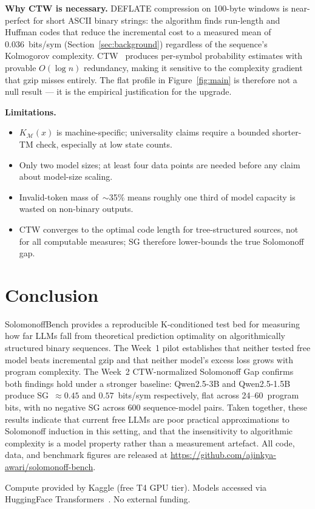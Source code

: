 \documentclass{article}
\begin{document}
\textbf{Why CTW is necessary.}
DEFLATE compression on 100-byte windows is near-perfect for short ASCII
binary strings: the algorithm finds run-length and Huffman codes that
reduce the incremental cost to a measured mean of 0.036~bits/sym
(Section~\ref{sec:background}) regardless of the sequence's
Kolmogorov complexity.
CTW~\citep{willems1995ctw} produces per-symbol probability estimates
with provable $O(\log n)$ redundancy, making it sensitive to the
complexity gradient that gzip misses entirely.
The flat profile in Figure~\ref{fig:main} is therefore not a null result —
it is the empirical justification for the upgrade.

\textbf{Limitations.}
\begin{itemize}
  \item $K_{\mathcal{M}}(x)$ is machine-specific; universality claims
        require a bounded shorter-TM check, especially at low state counts.
  \item Only two model sizes; at least four data points are needed before
        any claim about model-size scaling.
  \item Invalid-token mass of~$\sim$35\% means roughly one third of model
        capacity is wasted on non-binary outputs.
  \item CTW converges to the optimal code length for tree-structured sources,
        not for all computable measures; SG therefore lower-bounds the true
        Solomonoff gap.
\end{itemize}

\section{Conclusion}

SolomonoffBench provides a reproducible K-conditioned test bed for measuring
how far LLMs fall from theoretical prediction optimality on algorithmically
structured binary sequences.
The Week~1 pilot establishes that neither tested free model beats incremental
gzip and that neither model's excess loss grows with program complexity.
The Week~2 CTW-normalized Solomonoff Gap confirms both findings hold under a
stronger baseline: Qwen2.5-3B and Qwen2.5-1.5B produce SG~$\approx 0.45$ and
$0.57$~bits/sym respectively, flat across 24--60~program bits, with no negative
SG across 600 sequence-model pairs.
Taken together, these results indicate that current free LLMs are poor
practical approximations to Solomonoff induction in this setting, and that
the insensitivity to algorithmic complexity is a model property rather than a
measurement artefact.
All code, data, and benchmark figures are released at
\url{https://github.com/ajinkya-awari/solomonoff-bench}.

\begin{ack}
Compute provided by Kaggle (free T4 GPU tier).
Models accessed via HuggingFace Transformers~\citep{wolf2020transformers}.
No external funding.
\end{ack}



\end{document}
